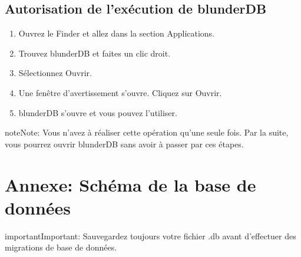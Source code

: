 \documentclass[letterpaper,10pt,french]{sphinxmanual}
\begin{document}
\subsection{Autorisation de l’exécution de blunderDB}
\label{\detokenize{annexe_mac_securite:autorisation-de-l-execution-de-blunderdb}}\begin{enumerate}
%
\item {} 
\sphinxAtStartPar
Ouvrez le Finder et allez dans la section Applications.

\item {} 
\sphinxAtStartPar
Trouvez blunderDB et faites un clic droit.

\item {} 
\sphinxAtStartPar
Sélectionnez Ouvrir.

\item {} 
\sphinxAtStartPar
Une fenêtre d’avertissement s’ouvre. Cliquez sur Ouvrir.

\item {} 
\sphinxAtStartPar
blunderDB s’ouvre et vous pouvez l’utiliser.

\end{enumerate}

\begin{sphinxadmonition}{note}{Note:}
\sphinxAtStartPar
Vous n’avez à réaliser cette opération qu’une seule fois. Par la
suite, vous pourrez ouvrir blunderDB sans avoir à passer par ces étapes.
\end{sphinxadmonition}

\sphinxstepscope


\section{Annexe: Schéma de la base de données}
\label{\detokenize{annexe_db_scheme:annexe-schema-de-la-base-de-donnees}}\label{\detokenize{annexe_db_scheme:annexe-db-migration}}\label{\detokenize{annexe_db_scheme::doc}}
\begin{sphinxadmonition}{important}{Important:}
\sphinxAtStartPar
Sauvegardez toujours votre fichier .db avant d’effectuer des migrations de base de données.
\end{sphinxadmonition}
\end{document}
